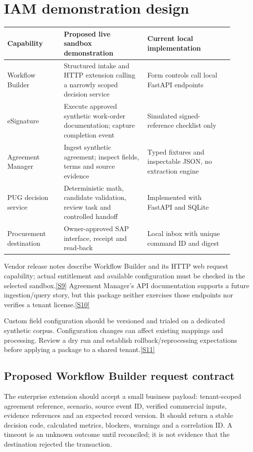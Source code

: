 \documentclass[11pt,letterpaper]{article}
\newcommand{\src}[1]{\hyperref[src:#1]{[#1]}}
\begin{document}
\section{IAM demonstration design}
\begin{longtable}{p{0.23\linewidth}p{0.34\linewidth}p{0.35\linewidth}}
\toprule Capability & Proposed live sandbox demonstration & Current local implementation\\\midrule
Workflow Builder & Structured intake and HTTP extension calling a narrowly scoped decision service & Form controls call local FastAPI endpoints\\
eSignature & Execute approved synthetic work-order documentation; capture completion event & Simulated signed-reference checklist only\\
Agreement Manager & Ingest synthetic agreement; inspect fields, terms and source evidence & Typed fixtures and inspectable JSON, no extraction engine\\
PUG decision service & Deterministic math, candidate validation, review task and controlled handoff & Implemented with FastAPI and SQLite\\
Procurement destination & Owner-approved SAP interface, receipt and read-back & Local inbox with unique command ID and digest\\
\bottomrule
\end{longtable}

Vendor release notes describe Workflow Builder and its HTTP web request capability; actual entitlement and available configuration must be checked in the selected sandbox.\src{S9} Agreement Manager's API documentation supports a future ingestion/query story, but this package neither exercises those endpoints nor verifies a tenant license.\src{S10}

Custom field configuration should be versioned and trialed on a dedicated synthetic corpus. Configuration changes can affect existing mappings and processing. Review a dry run and establish rollback/reprocessing expectations before applying a package to a shared tenant.\src{S11}

\subsection{Proposed Workflow Builder request contract}
The enterprise extension should accept a small business payload: tenant-scoped agreement reference, scenario, source event ID, verified commercial inputs, evidence references and an expected record version. It should return a stable decision code, calculated metrics, blockers, warnings and a correlation ID. A timeout is an unknown outcome until reconciled; it is not evidence that the destination rejected the transaction.
\end{document}
